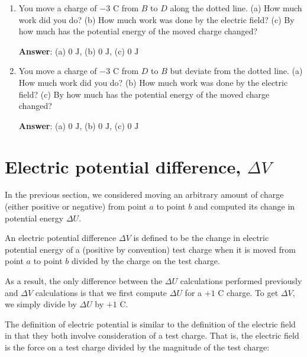 \documentclass{article}
\begin{document}
\begin{enumerate}
  \item You move a charge of $-3\text{ C}$ from $B$ to $D$ along the dotted line. (a) How much work did you do? (b) How much work was done by the electric field? (c) By how much has the potential energy of the moved charge changed?

     \ifsolutions
       {\bf Answer}: (a) $0\text{ J}$, (b) $0\text{ J}$, (c) $0\text{ J}$
     \else
       \vskip 48pt
     \fi
     \ifsolutions\else
     \vskip 48pt
     \fi

  \item You move a charge of $-3\text{ C}$ from $D$ to $B$ but deviate from the dotted line. (a) How much work did you do? (b) How much work was done by the electric field? (c) By how much has the potential energy of the moved charge changed?

     \ifsolutions
       {\bf Answer}: (a) $0\text{ J}$, (b) $0\text{ J}$, (c) $0\text{ J}$
     \fi

\end{enumerate}

\newpage

\section{Electric potential difference, $\Delta V$}

In the previous section, we considered moving an arbitrary amount of charge (either positive or negative) from point $a$ to point $b$ and computed its change in potential energy $\Delta U$. 

An electric potential difference $\Delta V$ is defined to be the change in electric potential energy of a (positive by convention) test charge when it is moved from point $a$ to point $b$ divided by the charge on the test charge.

As a result, the only difference between the $\Delta U$ calculations performed previously and $\Delta V$ calculations is that we first compute $\Delta U$ for a $+1\text{ C}$ charge. To get $\Delta V$, we simply divide by $\Delta U$ by $+1\text{ C}$.

The definition of electric potential is similar to the definition of the electric field in that they both involve consideration of a test charge. That is, the electric field is the force on a test charge divided by the magnitude of the test charge:
\end{document}
